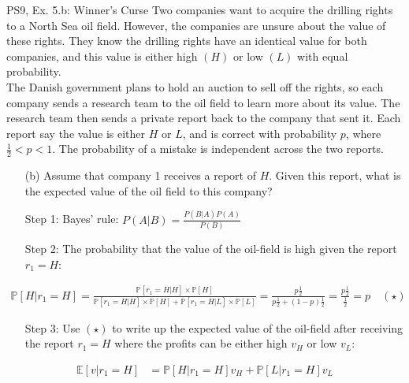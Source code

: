 \begin{frame}{PS9, Ex. 5.b: Winner's Curse}
      Two companies want to acquire the drilling rights to a North Sea oil field. However, the companies are unsure about the value of these rights. They know the drilling rights have an identical value for both companies, and this value is either high $(H)$ or low $(L)$ with equal probability.\\\smallskip
      The Danish government plans to hold an auction to sell off the rights, so each company sends a research team to the oil field to learn more about its value. The research team then sends a private report back to the company that sent it. Each report say the value is either $H$ or $L$, and is correct with probability $p$, where $\frac{1}{2} < p < 1$. The probability of a mistake is independent across the two reports.
      \begin{itemize}
        \item[(b)] Assume that company 1 receives a report of $H$. Given this report, what is the expected value of the oil field to this company?
        \item[Step 1:] Bayes' rule: $P(A|B)=\frac{P(B|A)P(A)}{P(B)}$
        \item[Step 2:] The probability that the value of the oil-field is high given the report $r_1=H$:
        \end{itemize}
        \vspace{-8pt}
        \begin{align*}
          \mathbb{P}[H|r_1=H]=\frac{\mathbb{P}[r_1=H|H]\times\mathbb{P}[H]}{\mathbb{P}[r_1=H|H]\times\mathbb{P}[H]+\mathbb{P}[r_1=H|L]\times\mathbb{P}[L]}=\frac{p\frac{1}{2}}{p\frac{1}{2}+(1-p)\frac{1}{2}}=\frac{p\frac{1}{2}}{\frac{1}{2}}=p\quad (\star)
        \end{align*}
        \vspace{-10pt}
        \begin{itemize}
        \item[Step 3:] Use $(\star)$ to write up the expected value of the oil-field after receiving the report $r_1=H$ where the profits can be either high $v_H$ or low $v_L$:
      \end{itemize}
      \vspace{-6pt}
      \begin{align*}
        \mathbb{E}[v|r_1=H]&=\mathbb{P}[H|r_1=H]v_H+\mathbb{P}[L|r_1=H]v_L
      \end{align*}
      \vfill\null
\end{frame}
